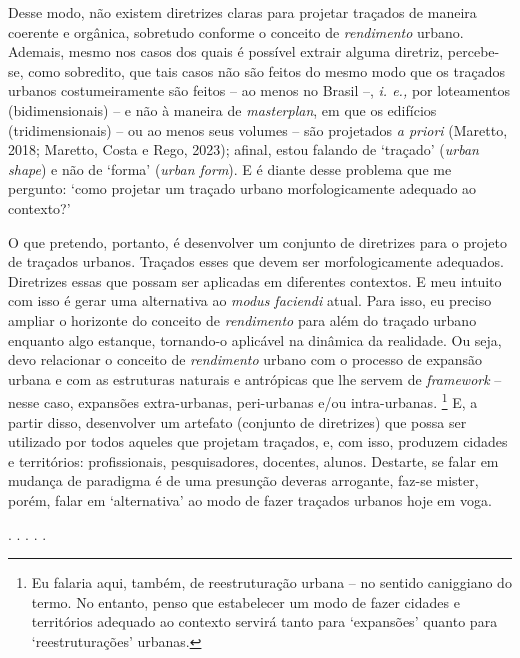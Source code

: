 \documentclass[]{report}
\begin{document}
	Desse modo, não existem diretrizes claras para projetar traçados de maneira coerente e orgânica, sobretudo conforme o conceito de \textit{rendimento} urbano. Ademais, mesmo nos casos dos quais é possível extrair alguma diretriz, percebe-se, como sobredito, que tais casos não são feitos do mesmo modo que os traçados urbanos costumeiramente são feitos – ao menos no Brasil –, \textit{i. e.,} por loteamentos (bidimensionais) – e não à maneira de \textit{masterplan}, em que os edifícios (tridimensionais) – ou ao menos seus volumes – são projetados \textit{a priori} (Maretto, 2018; Maretto, Costa e Rego, 2023); afinal, estou falando de `traçado' (\textit{urban shape}) e não de `forma' (\textit{urban form}). E é diante desse problema que me pergunto: `como projetar um traçado urbano morfologicamente adequado ao contexto?' 

	O que pretendo, portanto, é desenvolver um conjunto de diretrizes para o projeto de traçados urbanos. Traçados esses que devem ser morfologicamente adequados. Diretrizes essas que possam ser aplicadas em diferentes contextos. E meu intuito com isso é gerar uma alternativa ao \textit{modus faciendi} atual. Para isso, eu preciso ampliar o horizonte do conceito de \textit{rendimento} para além do traçado urbano enquanto algo estanque, tornando-o aplicável na dinâmica da realidade. Ou seja, devo relacionar o conceito de \textit{rendimento} urbano com o processo de expansão urbana e com as estruturas naturais e antrópicas que lhe servem de \textit{framework} – nesse caso, expansões extra-urbanas, peri-urbanas e/ou intra-urbanas.
		\footnote[7]{Eu falaria aqui, também, de reestruturação urbana – no sentido caniggiano do termo. No entanto, penso que estabelecer um modo de fazer cidades e territórios adequado ao contexto servirá tanto para `expansões' quanto para `reestruturações' urbanas.} 
	E, a partir disso, desenvolver um artefato (conjunto de diretrizes) que possa ser utilizado por todos aqueles que projetam traçados, e, com isso, produzem cidades e territórios: profissionais, pesquisadores, docentes, alunos. Destarte, se falar em mudança de paradigma é de uma presunção deveras arrogante, faz-se mister, porém, falar em `alternativa' ao modo de fazer traçados urbanos hoje em voga.
	
	\begin{center}
		. . . . .
	\end{center}
\end{document}
